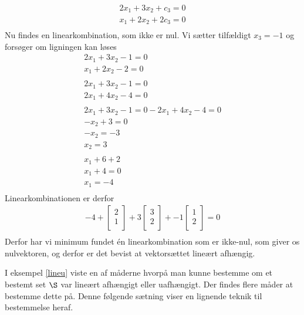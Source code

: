 \begin{eks}
\begin{align*}
2x_1+3x_2+c_3=0\\
x_1+2x_2+2c_3=0 \\
\end{align*}
\noindent
Nu findes en linearkombination, som ikke er nul. Vi sætter tilfældigt $x_3 = -1$ og forsøger om ligningen kan løses
\begin{align*}
2x_1+3x_2-1=0\\
x_1+2x_2-2=0\\
\\
2x_1+3x_2-1=0\\
2x_1+4x_2-4=0\\
\\	 
2x_1+3x_2-1=0 - 2x_1+4x_2-4=0 \\
-x_2+3=0\\
-x_2=-3\\
x_2=3\\
\\
x_1+6+2\\
x_1+4=0\\
x_1=-4\\
\end{align*}
Linearkombinationen er derfor
\begin{align*}
-4+
\begin{bmatrix}
           2 \\
           1 \\
\end{bmatrix}
+ 3
\begin{bmatrix}
           3 \\
           2 \\
\end{bmatrix}
+ -1
\begin{bmatrix}
           1 \\
           2 \\
\end{bmatrix}
=0 \\
\end{align*}
Derfor har vi minimum fundet én linearkombination som er ikke-nul, som giver os nulvektoren, og derfor er det bevist at vektorsættet lineært afhængig.
\end{eks}
I eksempel \ref{lineu} viste en af måderne hvorpå man kunne bestemme om et bestemt set $\S$ var lineært afhængigt eller uafhængigt. Der findes flere måder at bestemme dette på. Denne følgende sætning viser en lignende teknik til bestemmelse heraf. 

